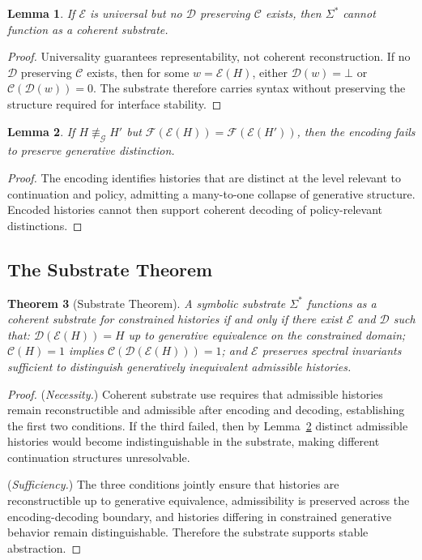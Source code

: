 \documentclass[12pt, a4paper]{article}
\theoremstyle{plain}
\newtheorem{theorem}{Theorem}[section]
\newtheorem{lemma}[theorem]{Lemma}
\theoremstyle{definition}
\theoremstyle{remark}
\begin{document}
\begin{lemma}
\label{lem:universality}
If $\mathcal{E}$ is universal but no $\mathcal{D}$ preserving $\mathcal{C}$ exists, then $\Sigma^*$ cannot function as a coherent substrate.
\end{lemma}

\begin{proof}
Universality guarantees representability, not coherent reconstruction. If no $\mathcal{D}$ preserving $\mathcal{C}$ exists, then for some $w = \mathcal{E}(H)$, either $\mathcal{D}(w) = \bot$ or $\mathcal{C}(\mathcal{D}(w)) = 0$. The substrate therefore carries syntax without preserving the structure required for interface stability.
\end{proof}

\begin{lemma}
\label{lem:spectral}
If $H \not\equiv_{\mathcal{G}} H'$ but $\mathcal{F}(\mathcal{E}(H)) = \mathcal{F}(\mathcal{E}(H'))$, then the encoding fails to preserve generative distinction.
\end{lemma}

\begin{proof}
The encoding identifies histories that are distinct at the level relevant to continuation and policy, admitting a many-to-one collapse of generative structure. Encoded histories cannot then support coherent decoding of policy-relevant distinctions.
\end{proof}

\subsection{The Substrate Theorem}

\begin{theorem}[Substrate Theorem]
\label{thm:substrate}
A symbolic substrate $\Sigma^*$ functions as a coherent substrate for constrained histories if and only if there exist $\mathcal{E}$ and $\mathcal{D}$ such that: $\mathcal{D}(\mathcal{E}(H)) = H$ up to generative equivalence on the constrained domain; $\mathcal{C}(H) = 1$ implies $\mathcal{C}(\mathcal{D}(\mathcal{E}(H))) = 1$; and $\mathcal{E}$ preserves spectral invariants sufficient to distinguish generatively inequivalent admissible histories.
\end{theorem}

\begin{proof}
(\textit{Necessity.}) Coherent substrate use requires that admissible histories remain reconstructible and admissible after encoding and decoding, establishing the first two conditions. If the third failed, then by Lemma~\ref{lem:spectral} distinct admissible histories would become indistinguishable in the substrate, making different continuation structures unresolvable.

(\textit{Sufficiency.}) The three conditions jointly ensure that histories are reconstructible up to generative equivalence, admissibility is preserved across the encoding-decoding boundary, and histories differing in constrained generative behavior remain distinguishable. Therefore the substrate supports stable abstraction.
\end{proof}
\end{document}
